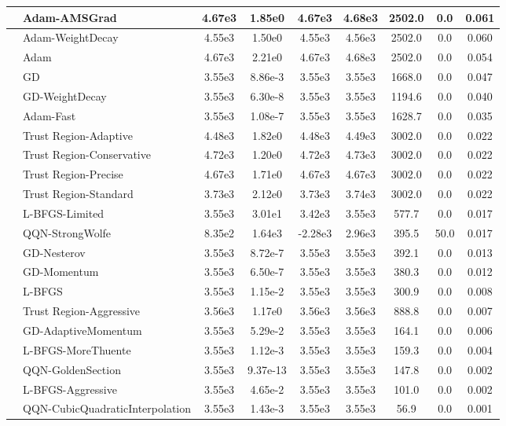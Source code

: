 \documentclass{article}
\begin{document}
\begin{longtable}{|l|l|c|c|c|c|c|c|c|}
\hline
 & Adam-AMSGrad & 4.67e3 & 1.85e0 & 4.67e3 & 4.68e3 & 2502.0 & 0.0 & 0.061 \\
\hline
 & Adam-WeightDecay & 4.55e3 & 1.50e0 & 4.55e3 & 4.56e3 & 2502.0 & 0.0 & 0.060 \\
\hline
 & Adam & 4.67e3 & 2.21e0 & 4.67e3 & 4.68e3 & 2502.0 & 0.0 & 0.054 \\
\hline
 & GD & 3.55e3 & 8.86e-3 & 3.55e3 & 3.55e3 & 1668.0 & 0.0 & 0.047 \\
\hline
 & GD-WeightDecay & 3.55e3 & 6.30e-8 & 3.55e3 & 3.55e3 & 1194.6 & 0.0 & 0.040 \\
\hline
 & Adam-Fast & 3.55e3 & 1.08e-7 & 3.55e3 & 3.55e3 & 1628.7 & 0.0 & 0.035 \\
\hline
 & Trust Region-Adaptive & 4.48e3 & 1.82e0 & 4.48e3 & 4.49e3 & 3002.0 & 0.0 & 0.022 \\
\hline
 & Trust Region-Conservative & 4.72e3 & 1.20e0 & 4.72e3 & 4.73e3 & 3002.0 & 0.0 & 0.022 \\
\hline
 & Trust Region-Precise & 4.67e3 & 1.71e0 & 4.67e3 & 4.67e3 & 3002.0 & 0.0 & 0.022 \\
\hline
 & Trust Region-Standard & 3.73e3 & 2.12e0 & 3.73e3 & 3.74e3 & 3002.0 & 0.0 & 0.022 \\
\hline
 & L-BFGS-Limited & 3.55e3 & 3.01e1 & 3.42e3 & 3.55e3 & 577.7 & 0.0 & 0.017 \\
\hline
 & QQN-StrongWolfe & 8.35e2 & 1.64e3 & -2.28e3 & 2.96e3 & 395.5 & 50.0 & 0.017 \\
\hline
 & GD-Nesterov & 3.55e3 & 8.72e-7 & 3.55e3 & 3.55e3 & 392.1 & 0.0 & 0.013 \\
\hline
 & GD-Momentum & 3.55e3 & 6.50e-7 & 3.55e3 & 3.55e3 & 380.3 & 0.0 & 0.012 \\
\hline
 & L-BFGS & 3.55e3 & 1.15e-2 & 3.55e3 & 3.55e3 & 300.9 & 0.0 & 0.008 \\
\hline
 & Trust Region-Aggressive & 3.56e3 & 1.17e0 & 3.56e3 & 3.56e3 & 888.8 & 0.0 & 0.007 \\
\hline
 & GD-AdaptiveMomentum & 3.55e3 & 5.29e-2 & 3.55e3 & 3.55e3 & 164.1 & 0.0 & 0.006 \\
\hline
 & L-BFGS-MoreThuente & 3.55e3 & 1.12e-3 & 3.55e3 & 3.55e3 & 159.3 & 0.0 & 0.004 \\
\hline
 & QQN-GoldenSection & 3.55e3 & 9.37e-13 & 3.55e3 & 3.55e3 & 147.8 & 0.0 & 0.002 \\
\hline
 & L-BFGS-Aggressive & 3.55e3 & 4.65e-2 & 3.55e3 & 3.55e3 & 101.0 & 0.0 & 0.002 \\
\hline
 & QQN-CubicQuadraticInterpolation & 3.55e3 & 1.43e-3 & 3.55e3 & 3.55e3 & 56.9 & 0.0 & 0.001 \\

\end{longtable}
\end{document}
